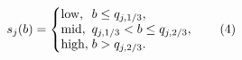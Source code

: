\begin{equation}
s_j(b)=\left\{\begin{array}{@{}l@{\;}l@{}}
\mathrm{low}, & b\le q_{j,1/3},\\
\mathrm{mid}, & q_{j,1/3}<b\le q_{j,2/3},\\
\mathrm{high}, & b>q_{j,2/3}.
\end{array}\right.
\label{eq:tertile_discretization}
\tag{4}
\end{equation}
